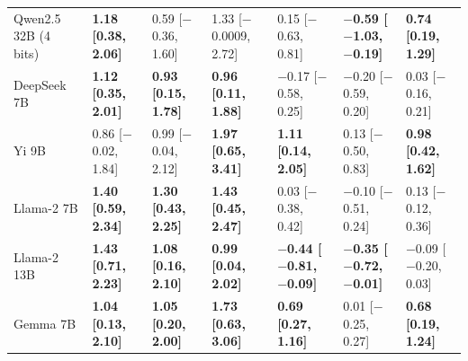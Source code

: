 \begin{tabular}{lllllll}
Qwen2.5 32B (4 bits) & \textbf{1.18 [0.38, 2.06]} & 0.59 [$-$0.36, 1.60] & 1.33 [$-$0.0009, 2.72] & 0.15 [$-$0.63, 0.81] & \textbf{$-$0.59 [$-$1.03, $-$0.19]} & \textbf{0.74 [0.19, 1.29]} \\
DeepSeek 7B & \textbf{1.12 [0.35, 2.01]} & \textbf{0.93 [0.15, 1.78]} & \textbf{0.96 [0.11, 1.88]} & $-$0.17 [$-$0.58, 0.25] & $-$0.20 [$-$0.59, 0.20] & 0.03 [$-$0.16, 0.21] \\
Yi 9B & 0.86 [$-$0.02, 1.84] & 0.99 [$-$0.04, 2.12] & \textbf{1.97 [0.65, 3.41]} & \textbf{1.11 [0.14, 2.05]} & 0.13 [$-$0.50, 0.83] & \textbf{0.98 [0.42, 1.62]} \\
Llama-2 7B & \textbf{1.40 [0.59, 2.34]} & \textbf{1.30 [0.43, 2.25]} & \textbf{1.43 [0.45, 2.47]} & 0.03 [$-$0.38, 0.42] & $-$0.10 [$-$0.51, 0.24] & 0.13 [$-$0.12, 0.36] \\
Llama-2 13B & \textbf{1.43 [0.71, 2.23]} & \textbf{1.08 [0.16, 2.10]} & \textbf{0.99 [0.04, 2.02]} & \textbf{$-$0.44 [$-$0.81, $-$0.09]} & \textbf{$-$0.35 [$-$0.72, $-$0.01]} & $-$0.09 [$-$0.20, 0.03] \\
Gemma 7B & \textbf{1.04 [0.13, 2.10]} & \textbf{1.05 [0.20, 2.00]} & \textbf{1.73 [0.63, 3.06]} & \textbf{0.69 [0.27, 1.16]} & 0.01 [$-$0.25, 0.27] & \textbf{0.68 [0.19, 1.24]} \\
\bottomrule
\end{tabular}
